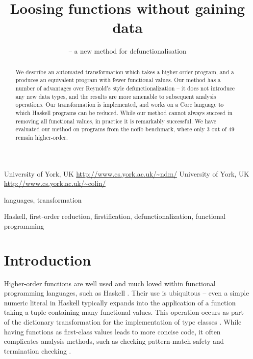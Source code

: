 \documentclass[preprint]{sigplanconf}
\begin{document}
\copyrightdata{[to be supplied]}

\titlebanner{\today{} - \currenttime{}}        %
\preprintfooter{}   %

\title{Loosing functions without gaining data}
\subtitle{ -- a new method for defunctionalisation}

           {University of York, UK}
           {\url{http://www.cs.york.ac.uk/~ndm/}}
           {University of York, UK}
           {\url{http://www.cs.york.ac.uk/~colin/}}

\maketitle

\begin{abstract}
We describe an automated transformation which takes a higher-order program, and a produces an equivalent program with fewer functional values. Our method has a number of advantages over Reynold's style defunctionalization -- it does not introduce any new data types, and the results are more amenable to subsequent analysis operations. Our transformation is implemented, and works on a Core language to which Haskell programs can be reduced. While our method cannot always succeed in removing all functional values, in practice it is remarkably successful. We have evaluated our method on programs from the nofib benchmark, where only 3 out of 49 remain higher-order.
\end{abstract}


\terms
languages, transformation

\keywords
Haskell, first-order reduction, firstification, defunctionalization, functional programming

\section{Introduction}

Higher-order functions are well used and much loved within functional programming languages, such as Haskell \cite{haskell}. Their use is ubiquitous -- even a simple numeric literal in Haskell typically expands into the application of a function taking a tuple containing many functional values. This operation occurs as part of the dictionary transformation for the implementation of type classes \cite{wadler:type_classes}. While having functions as first-class values leads to more concise code, it often complicates analysis methods, such as checking pattern-match safety \cite{me:catch_icfp} and termination checking \cite{sereni:higher_order_termination}.
\end{document}
